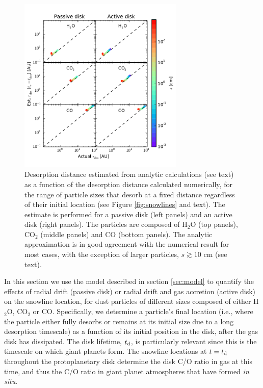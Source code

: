 \documentclass[apj]{emulateapj}
\begin{document}
\begin{figure}[t!]
\centering
\includegraphics[width=0.7\textwidth]{../../figs/desorption_distance_actual_vs_estimated_passive_active_new.pdf}
\caption{Desorption distance estimated from analytic calculations (see text) as a function of the desorption distance calculated numerically, for the range of particle sizes that desorb at a fixed distance regardless of their initial location (see Figure \ref{fig:snowlines} and text). The estimate is performed for a passive disk (left panels) and an active disk (right panels).  The particles are composed of H$_2$O (top panels), CO$_2$ (middle panels) and CO (bottom panels). The analytic approximation is in good agreement with the numerical result for most cases, with the exception of larger particles, $s \gtrsim 10$ cm (see text).}
\label{fig:an_vs_actual}
\end{figure}

In this section we use the model described in section \ref{sec:model} to quantify the effects of radial drift (passive disk) or radial drift and gas accretion (active disk) on the snowline location, for dust particles of different sizes composed of either H$_2$O, CO$_2$ or CO. Specifically, we determine a particle's final location (i.e., where the particle either fully desorbs or remains at its initial size due to a long desorption timescale) as a function of its initial position in the disk, after the gas disk has dissipated. The disk lifetime, $t_{\rm d}$, is particularly relevant since this is the timescale on which giant planets form. The snowline locations at $t=t_{\rm d}$ throughout the protoplanetary disk determine the disk C/O ratio in gas at this time, and thus the C/O ratio in giant planet atmospheres that have formed \textit{in situ}.   
\end{document}
